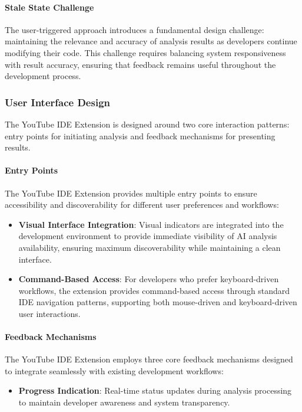 \begin{spacing}{1.2}
\paragraph{Stale State Challenge}
The user-triggered approach introduces a fundamental design challenge: maintaining the relevance and accuracy of analysis results as developers continue modifying their code. This challenge requires balancing system responsiveness with result accuracy, ensuring that feedback remains useful throughout the development process.

\subsubsection{User Interface Design}
The YouTube IDE Extension is designed around two core interaction patterns: entry points for initiating analysis and feedback mechanisms for presenting results.

\paragraph{Entry Points}
The YouTube IDE Extension provides multiple entry points to ensure accessibility and discoverability for different user preferences and workflows:

\begin{itemize}
    \item \textbf{Visual Interface Integration}: Visual indicators are integrated into the development environment to provide immediate visibility of AI analysis availability, ensuring maximum discoverability while maintaining a clean interface.
    
    \item \textbf{Command-Based Access}: For developers who prefer keyboard-driven workflows, the extension provides command-based access through standard IDE navigation patterns, supporting both mouse-driven and keyboard-driven user interactions.
\end{itemize}

\paragraph{Feedback Mechanisms}
The YouTube IDE Extension employs three core feedback mechanisms designed to integrate seamlessly with existing development workflows:

\begin{itemize}
    \item \textbf{Progress Indication}: Real-time status updates during analysis processing to maintain developer awareness and system transparency.
    

\end{itemize}
\end{spacing}
